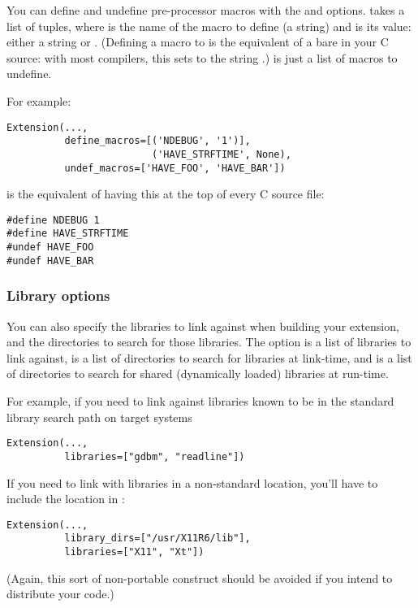 \documentclass{howto}
\begin{document}
You can define and undefine pre-processor macros with the
 and  options.
 takes a list of  tuples, where
 is the name of the macro to define (a string) and
 is its value: either a string or .  (Defining a
macro  to  is the equivalent of a bare
 in your C source: with most compilers, this sets
 to the string .)   is just
a list of macros to undefine.

For example:
\begin{verbatim}
Extension(...,
          define_macros=[('NDEBUG', '1')],
                         ('HAVE_STRFTIME', None),
          undef_macros=['HAVE_FOO', 'HAVE_BAR'])
\end{verbatim}
is the equivalent of having this at the top of every C source file:
\begin{verbatim}
#define NDEBUG 1
#define HAVE_STRFTIME
#undef HAVE_FOO
#undef HAVE_BAR
\end{verbatim}


\subsubsection{Library options}

You can also specify the libraries to link against when building your
extension, and the directories to search for those libraries.  The
 option is a list of libraries to link against,
 is a list of directories to search for libraries at 
link-time, and  is a list of directories to 
search for shared (dynamically loaded) libraries at run-time.

For example, if you need to link against libraries known to be in the
standard library search path on target systems
\begin{verbatim}
Extension(...,
          libraries=["gdbm", "readline"])
\end{verbatim}

If you need to link with libraries in a non-standard location, you'll
have to include the location in :
\begin{verbatim}
Extension(...,
          library_dirs=["/usr/X11R6/lib"],
          libraries=["X11", "Xt"])
\end{verbatim}
(Again, this sort of non-portable construct should be avoided if you
intend to distribute your code.)
\end{document}
